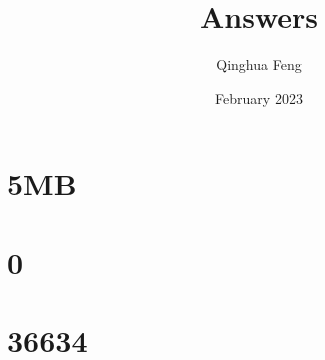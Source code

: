 \documentclass{article}
\title{Answers}
\author{Qinghua Feng }
\date{February 2023}
\begin{document}
\maketitle

\section{5MB}
\section{0}
\section{36634}
\end{document}

